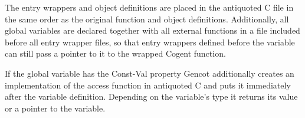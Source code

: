 The entry wrappers and object definitions are placed in the antiquoted C file in the same order as the original function
and object definitions. Additionally, all global variables are declared together with all external functions in a 
file included before all entry wrapper files, so that entry
wrappers defined before the variable can still pass a pointer to it to the wrapped Cogent function.

If the global variable has the Const-Val property Gencot additionally creates an implementation of the access function
in antiquoted C and puts it immediately after the variable definition. Depending on the variable's type it returns its
value or a pointer to the variable. 
